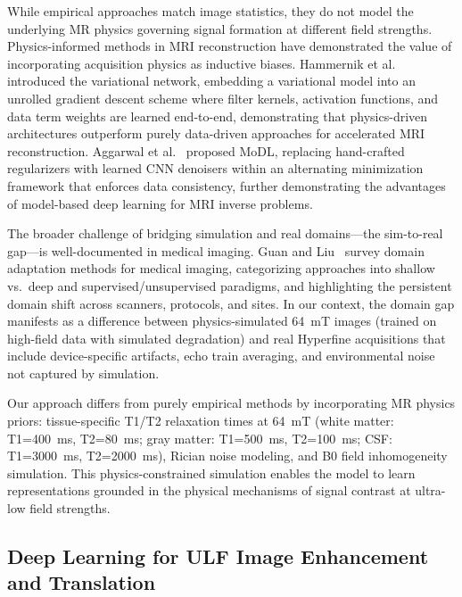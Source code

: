 While empirical approaches match image statistics, they do not model the underlying MR physics governing signal formation at different field strengths. Physics-informed methods in MRI reconstruction have demonstrated the value of incorporating acquisition physics as inductive biases. Hammernik et al.~\cite{hammernik2018variational} introduced the variational network, embedding a variational model into an unrolled gradient descent scheme where filter kernels, activation functions, and data term weights are learned end-to-end, demonstrating that physics-driven architectures outperform purely data-driven approaches for accelerated MRI reconstruction. Aggarwal et al.~\cite{aggarwal2019modl} proposed MoDL, replacing hand-crafted regularizers with learned CNN denoisers within an alternating minimization framework that enforces data consistency, further demonstrating the advantages of model-based deep learning for MRI inverse problems.

The broader challenge of bridging simulation and real domains---the sim-to-real gap---is well-documented in medical imaging. Guan and Liu~\cite{guan2022domainadaptation} survey domain adaptation methods for medical imaging, categorizing approaches into shallow vs.\ deep and supervised/unsupervised paradigms, and highlighting the persistent domain shift across scanners, protocols, and sites. In our context, the domain gap manifests as a difference between physics-simulated 64~mT images (trained on high-field data with simulated degradation) and real Hyperfine acquisitions that include device-specific artifacts, echo train averaging, and environmental noise not captured by simulation.

Our approach differs from purely empirical methods by incorporating MR physics priors: tissue-specific T1/T2 relaxation times at 64~mT (white matter: T1=400~ms, T2=80~ms; gray matter: T1=500~ms, T2=100~ms; CSF: T1=3000~ms, T2=2000~ms), Rician noise modeling, and B0 field inhomogeneity simulation. This physics-constrained simulation enables the model to learn representations grounded in the physical mechanisms of signal contrast at ultra-low field strengths.

\subsection{Deep Learning for ULF Image Enhancement and Translation}

